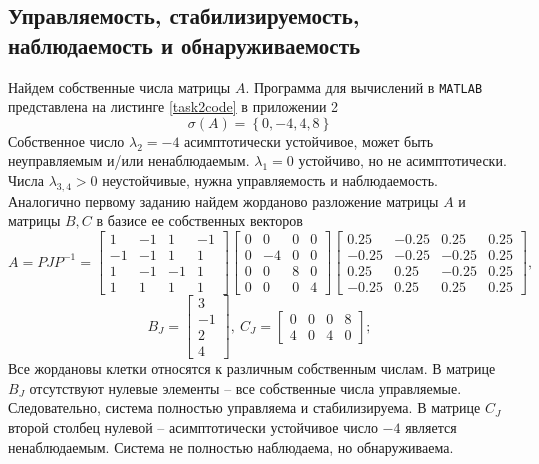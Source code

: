 \documentclass[a4paper, 12pt]{article}
\begin{document}
    \subsection{Управляемость, стабилизируемость, наблюдаемость и обнаруживаемость}
    Найдем собственные числа матрицы $A$. Программа для вычислений в \texttt{MATLAB} представлена на листинге \ref{task2code} в приложении 2
    $$
    \sigma\left( A \right)=\left\{ 0,-4,4,8 \right\}
    $$
    Собственное число $\lambda_2=-4$ асимптотически устойчивое, может быть неуправляемым и/или
    ненаблюдаемым. $\lambda_1=0$ устойчиво, но не асимптотически. Числа $\lambda_{3,4}>0$ неустойчивые,
    нужна управляемость и наблюдаемость.
    Аналогично первому заданию найдем жорданово разложение матрицы $A$ и матрицы $B,C$
    в базисе ее собственных векторов
    $$
    A=PJP^{-1}=\begin{bmatrix}
    1    &-1     &1    &-1\\
    -1    &-1     &1     &1\\
     1    &-1    &-1     &1\\
     1     &1     &1     &1
    \end{bmatrix}\begin{bmatrix}
    0     &0     &0     &0\\
    0    &-4     &0     &0\\
    0     &0     &8     &0\\
    0     &0     &0     &4
    \end{bmatrix}\begin{bmatrix}
    0.25   &-0.25    &0.25    &0.25\\
   -0.25   &-0.25   &-0.25    &0.25\\
    0.25    &0.25   &-0.25    &0.25\\
   -0.25    &0.25    &0.25    &0.25
    \end{bmatrix},
    $$
    $$
    B_J=\begin{bmatrix}
        3\\
    -1\\
     2\\
     4
    \end{bmatrix},\ C_J=\begin{bmatrix}
        0     &0     &0     &8\\
     4     &0     &4     &0
    \end{bmatrix};
    $$
    Все жордановы клетки относятся к различным собственным числам.
    В матрице $B_J$ отсутствуют нулевые элементы -- все собственные числа управляемые. Следовательно,
    система полностью управляема и стабилизируема. В матрице $C_J$ второй столбец нулевой -- асимптотически устойчивое число
    $-4$ является ненаблюдаемым. Система не полностью наблюдаема, но обнаруживаема.
\end{document}
